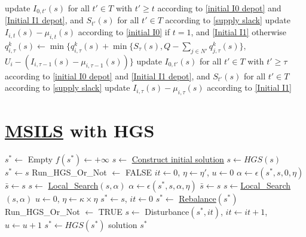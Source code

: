 \documentclass{article}
\begin{document}
\begin{algorithm}[H]
\captionsetup{labelformat=empty}
\caption{\textbf{Adjust Delivery Quantities}($i$, $t$, $s$)}
\label{alg:AdjustDeliveryQuantities}
\begin{algorithmic}[1]
\STATE update $I_{0,t'}(s)$ for all $t'\in T$ with $t'\geq t$ according to \eqref{initial I0 depot} and \eqref{Initial I1 depot}, and $S_{t'}(s)$ for all $t'\in T$ according to \eqref{supply slack}
\STATE update $I_{i,t}(s)-\mu_{i,t}(s)$ according to \eqref{initial I0} if $t=1$, and \eqref{Initial I1} otherwise
        \STATE $q^k_{i,\tau}(s)\gets\min\{q^k_{i,\tau}(s)+\min\{S_\tau(s), Q-\sum_{j\in N'}q^k_{j,\tau}(s)\},$
        \STATE \hspace{9em} $U_i-(I_{i,\tau-1}(s)-\mu_{i,\tau-1}(s))\}$
        \STATE update $I_{0,t'}(s)$ for all $t'\in T$ with $t'\geq \tau$ according to \eqref{initial I0 depot} and \eqref{Initial I1 depot}, and $S_{t'}(s)$ for all $t'\in T$ according to \eqref{supply slack}
    \ENDIF
    \STATE update $I_{i,\tau}(s)-\mu_{i,\tau}(s)$ according to \eqref{Initial I1}
\ENDFOR
\end{algorithmic}
\end{algorithm}




\section{\hyperref[alg:MSILS]{MSILS} with HGS}\label{MSILS with HGS}


\begin{algorithm}[H]
\caption{\textbf{\hyperref[alg:MSILS]{MSILS} with HGS in \cite{vidal2022hybrid}}}\label{alg:MSILS with HGS}
\begin{algorithmic}[1]
\STATE $s^* \gets$ Empty \AND  $f(s^*) \gets +\infty$  
\STATE $s\gets$ \hyperref[alg:InitialSchedule]{Construct initial solution} 
\STATE $s \gets HGS(s)$ 
 \STATE $s^*\gets s$ \ENDIF
\STATE Run\_HGS\_Or\_Not $\gets$ FALSE
\STATE  $it \gets 0$, $\eta \gets \eta'$, $u\gets 0$ 
    \STATE $\alpha \gets \epsilon (s^*, s , 0, \eta)$  
    \STATE $\bar{s} \gets s$
    \STATE $s\gets$ \hyperref[alg:LocalSearch]{Local\_Search}$(s,\alpha)$    
        \STATE  $\alpha \gets \epsilon (s^*, s , \alpha, \eta)$       
        \STATE $\bar{s} \gets s$
        \STATE $s\gets$\hyperref[alg:LocalSearch]{Local\_Search}$(s,\alpha)$       
    \ENDWHILE
        \STATE $u\gets 0$, $\eta \gets \kappa \times \eta$ 
    \ENDIF
        \STATE $s^*\gets s$, $it\gets 0$
        \STATE $s^*\gets$ \hyperref[alg:rebalance]{Rebalance}$(s^*)$            
        \STATE Run\_HGS\_Or\_Not $\gets$ TRUE
    \ENDIF
    \STATE $s \gets$ Disturbance$(s^*, it)$, $it\gets it+1$, $u\gets u+1$ 
\ENDWHILE 
{}
    \STATE $s^* \gets HGS(s^*)$
\ENDIF
\ENDFOR
\RETURN solution $s^*$
\end{algorithmic}
\end{algorithm}
\end{document}
